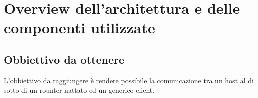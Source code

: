 

\chapter{Overview dell'architettura e delle componenti utilizzate}
\setlength{\parskip}{1em}
\setlength{\parindent}{0em}
\renewcommand{\baselinestretch}{1.15}

\label{ch:1}

\section{Obbiettivo da ottenere}

L'obbiettivo da raggiungere \`e rendere possibile la comunicazione tra un host al di sotto di un rounter nattato ed un generico client.


\begin{figure}[ht]
	\centering
	
	\caption{}
	\label{fig:modello_a_strati}
\end{figure}

